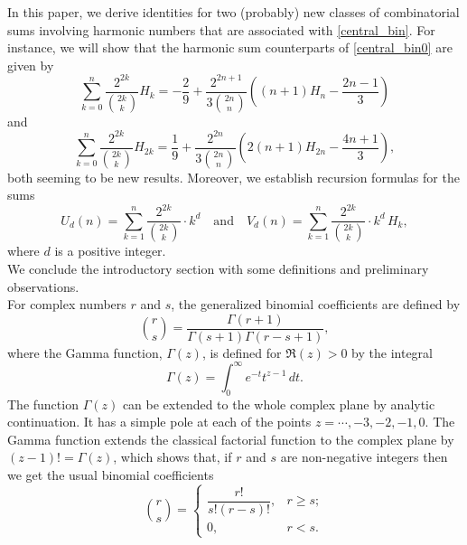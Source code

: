 \documentclass[11pt,reqno]{amsart}
\theoremstyle{plain}
\numberwithin{equation}{section}
\begin{document}
In this paper, we derive identities for two (probably) new classes of combinatorial sums involving harmonic numbers 
that are associated with \eqref{central_bin}. For instance, we will show that the harmonic sum counterparts of \eqref{central_bin0}
are given by 
\begin{equation}\label{central_bin0_har}
\sum_{k=0}^n \frac{2^{2k}}{\binom{2k}{k}} H_k = - \frac{2}{9} + \frac{2^{2n+1}}{3\binom{2n}{n}}\left ( (n+1)H_n - \frac{2n-1}{3} \right ) 
\end{equation}
and
\begin{equation}\label{central_bin_evenhar}
\sum_{k=0}^n \frac{2^{2k}}{\binom{2k}{k}} H_{2k} = \frac{1}{9} + \frac{2^{2n}}{3 \binom{2n}{n}}\left (2(n+1)H_{2n} - \frac{4n+1}{3}\right ),
\end{equation}
both seeming to be new results. Moreover, we establish recursion formulas for the sums
\begin{equation*}
U_d(n) = \sum_{k=1}^n \frac{2^{2k}}{\binom{2k}{k}} \cdot k^d \quad \mbox{and}\quad  
V_d(n) = \sum_{k=1}^n \frac{2^{2k}}{\binom{2k}{k}}\cdot k^d\,H_k,
\end{equation*}
where $d$ is a positive integer. \\

We conclude the introductory section with some definitions and preliminary observations. \\
For complex numbers $r$ and $s$, the generalized binomial coefficients are defined by
\begin{equation*}
\binom {r}{s} = \frac{\Gamma (r+1)}{\Gamma (s+1) \Gamma (r-s+1)},
\end{equation*}
where the Gamma function, $\Gamma(z)$, is defined for $\Re(z)>0$ by the integral \cite{Srivastava}
\begin{equation*}
\Gamma (z) = \int_0^\infty e^{- t} t^{z - 1}\,dt.
\end{equation*}
The function $\Gamma(z)$ can be extended to the whole complex plane by analytic continuation. 
It has a simple pole at each of the points $z=\cdots,-3,-2,-1,0$. 
The Gamma function extends the classical factorial function to the complex plane by $(z-1)!=\Gamma(z)$,
which shows that, if $r$ and $s$ are non-negative integers then we get the usual binomial coefficients
\begin{equation*}
\binom {r}{s} =
\begin{cases}
\dfrac{r!}{s!(r - s)!}, & \text{$r\geq s$};\\
0, & \text{$r<s$}.
\end{cases}
\end{equation*} 
\end{document}
